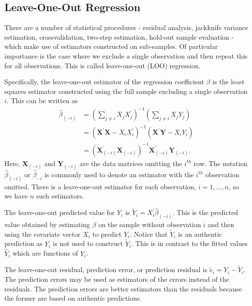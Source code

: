 \documentclass[10pt]{article}
\begin{document}
\subsection{Leave-One-Out Regression}
There are a number of statistical procedures - residual analysis, jackknife variance estimation, crossvalidation, two-step estimation, hold-out sample evaluation - which make use of estimators constructed on sub-samples. Of particular importance is the case where we exclude a single observation and then repeat this for all observations. This is called leave-one-out (LOO) regression.

Specifically, the leave-one-out estimator of the regression coefficient $\beta$ is the least squares estimator constructed using the full sample excluding a single observation $i$. This can be written as
$$
\begin{aligned}
\widehat{\beta}_{(-i)} &=\left(\sum_{j \neq i} X_{j} X_{j}^{\prime}\right)^{-1}\left(\sum_{j \neq i} X_{j} Y_{j}\right) \\
&=\left(\boldsymbol{X}^{\prime} \boldsymbol{X}-X_{i} X_{i}^{\prime}\right)^{-1}\left(\boldsymbol{X}^{\prime} \boldsymbol{Y}-X_{i} Y_{i}\right) \\
&=\left(\boldsymbol{X}_{(-i)}^{\prime} \boldsymbol{X}_{(-i)}\right)^{-1} \boldsymbol{X}_{(-i)}^{\prime} \boldsymbol{Y}_{(-i)} .
\end{aligned}
$$
Here, $\boldsymbol{X}_{(-i)}$ and $\boldsymbol{Y}_{(-i)}$ are the data matrices omitting the $i^{t h}$ row. The notation $\widehat{\beta}_{(-i)}$ or $\widehat{\beta}_{-i}$ is commonly used to denote an estimator with the $i^{t h}$ observation omitted. There is a leave-one-out estimator for each observation, $i=1, \ldots, n$, so we have $n$ such estimators.

The leave-one-out predicted value for $Y_{i}$ is $\widetilde{Y}_{i}=X_{i}^{\prime} \widehat{\beta}_{(-i)}$. This is the predicted value obtained by estimating $\beta$ on the sample without observation $i$ and then using the covariate vector $X_{i}$ to predict $Y_{i}$. Notice that $\widetilde{Y}_{i}$ is an authentic prediction as $Y_{i}$ is not used to construct $\widetilde{Y}_{i}$. This is in contrast to the fitted values $\widehat{Y}_{i}$ which are functions of $Y_{i}$.

The leave-one-out residual, prediction error, or prediction residual is $\widetilde{e}_{i}=Y_{i}-\widetilde{Y}_{i}$. The prediction errors may be used as estimators of the errors instead of the residuals. The prediction errors are better estimators than the residuals because the former are based on authentic predictions.
\end{document}
